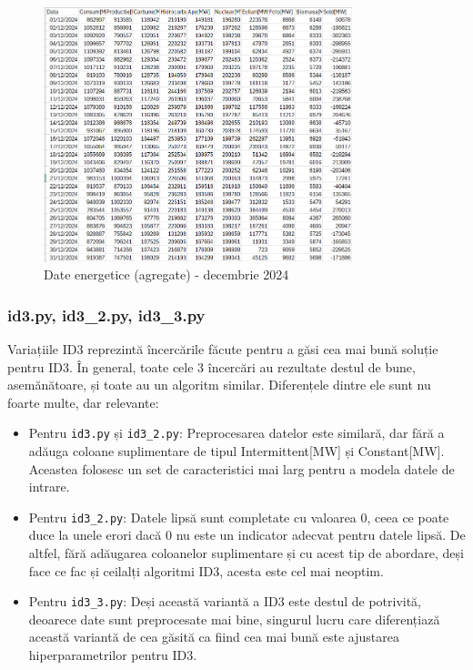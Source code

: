 \documentclass[a4paper,12pt]{article}
\begin{document}
\begin{figure}
    \centering
    \includegraphics[width=0.8\textwidth]{img2.png}
    \caption{Date energetice (agregate) - decembrie 2024}
    \label{fig:date zilnice decembrie 2024}
\end{figure}

\subsubsection{id3.py, id3\_2.py, id3\_3.py}
Variațiile ID3 reprezintă încercările făcute pentru a găsi cea mai bună soluție pentru ID3. În general, toate cele 3 încercări au rezultate destul de bune, asemănătoare, și toate au un algoritm similar. Diferențele dintre ele sunt nu foarte multe, dar relevante:
\begin{itemize}
    \item Pentru \texttt{id3.py} și \texttt{id3\_2.py}: Preprocesarea datelor este similară, dar fără a adăuga coloane suplimentare de tipul Intermittent[MW] și Constant[MW]. Aceastea folosesc un set de caracteristici mai larg pentru a modela datele de intrare.
    \item Pentru \texttt{id3\_2.py}: Datele lipsă sunt completate cu valoarea 0, ceea ce poate duce la unele erori dacă 0 nu este un indicator adecvat pentru datele lipsă. De altfel, fără adăugarea coloanelor suplimentare și cu acest tip de abordare, deși face ce fac și ceilalți algoritmi ID3, acesta este cel mai neoptim.
    \item Pentru \texttt{id3\_3.py}: Deși această variantă a ID3 este destul de potrivită, deoarece date sunt preprocesate mai bine, singurul lucru care diferențiază această variantă de cea găsită ca fiind cea mai bună este ajustarea hiperparametrilor pentru ID3.
\end{itemize}
\end{document}
